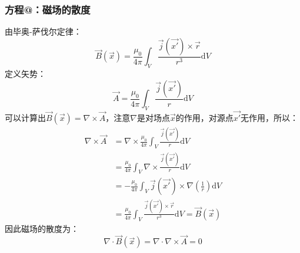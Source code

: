 \documentclass[12pt]{article}
\makeatletter
\newcommand{\Rmnum}[1]{\expandafter\@slowromancap\romannumeral #1@}
\makeatother
\begin{document}
\subsubsection{方程\Rmnum{3}：磁场的散度}
由毕奥-萨伐尔定律：
\begin{equation}
    \Vec{B}(\Vec{x})=\frac{\mu_0}{4\pi}\int_V \frac{\Vec{j}(\Vec{x'})\times \Vec{r}}{r^3}\mathrm{d}V
\end{equation}
定义矢势：
\begin{equation}
   \Vec{A}=\frac{\mu_0}{4\pi}\int_V \frac{\Vec{j}(\Vec{x'})}{r}\mathrm{d}V 
   \label{x3}
\end{equation}
可以计算出$\Vec{B}(\Vec{x})=\nabla\times \Vec{A}$，注意$\nabla$是对场点$\Vec{x}$的作用，对源点$\Vec{x'}$无作用，所以：
\begin{equation}
\begin{split}
     \nabla\times\Vec{A}&=\nabla\times\frac{\mu_0}{4\pi}\int_V
\frac{\Vec{j}(\Vec{x'})}{r}\mathrm{d}V\\ 
    &=\frac{\mu_0}{4\pi}\int_V \nabla\times \frac{\Vec{j}(\Vec{x'})}{r}\mathrm{d}V\\
    &=-\frac{\mu_0}{4\pi}\int_V \Vec{j}(\Vec{x'})\times\nabla(\frac{1}{r})\mathrm{d}V\\
    &=\frac{\mu_0}{4\pi}\int_V \frac{\Vec{j}(\Vec{x'})\times\Vec{r}}{r^3}\mathrm{d}V=\Vec{B}(\Vec{x})
\end{split}
\end{equation}
因此磁场的散度为：
\begin{equation}
    \nabla\cdot\Vec{B}(\Vec{x})=\nabla\cdot\nabla\times\Vec{A}=0
\end{equation}
\end{document}
